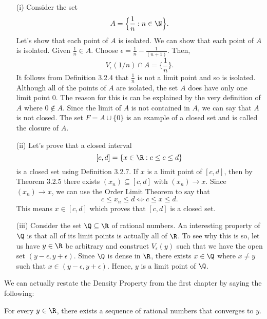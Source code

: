 \begin{ex}
\begin{enumerate}
    \item[(i)] Consider the set 
        \[ A = \Big\{ \frac{ 1 }{ n }  : n \in \N \Big\}.   \]
        Let's show that each point of \( A  \) is isolated. We can show that each point of \( A  \) is isolated. Given \( \frac{ 1 }{ n }  \in A \). Choose \( \epsilon = \frac{ 1 }{ n }  - \frac{ 1 }{ (n+1) }. \) Then, 
        \[ V_{\epsilon } (1/n) \cap A = \Big\{ \frac{ 1 }{ n } \Big\}. \]
        It follows from Definition 3.2.4 that \( \frac{ 1 }{ n }  \) is not a limit point and so is isolated. Although all of the points of \( A  \) are isolated, the set \( A  \) does have only one limit point 0. The reason for this is can be explained by the very definition of \( A  \) where \( 0 \notin A  \). Since the limit of \( A \) is not contained in \( A \), we can say that \( A  \) is not closed. The set \( F = A \cup \{ 0 \}  \) is an example of a closed set and is called the closure of \( A \).   
    \item[(ii)] Let's prove that a closed interval 
        \[ [c,d] = \{ x \in \R : c \leq c \leq d \}  \]
        is a closed set using Definition 3.2.7. If \( x \) is a limit point of \( [c,d] \), then by Theorem 3.2.5 there exists \( (x_n) \subseteq [c,d] \) with \( (x_n) \to x  \). Since \( (x_n) \to x  \), we can use the Order Limit Theorem to say that 
        \[ c \leq x_n \leq d \iff c \leq x \leq d. \]
        This means \( x \in [c,d] \) which proves that \( [c,d] \) is a closed set. 
    \item[(iii)] Consider the set \( \Q \subseteq \R  \) of rational numbers. An interesting property of \( \Q \) is that all of its limit points is actually all of \( \R  \). To see why this is so, let us have \( y \in \R  \) be arbitrary and construct \( V_{\epsilon }(y) \) such that we have the open set \( (y- \epsilon , y + \epsilon ) \). Since \( \Q  \) is dense in \( \R \), there exists \( x \in \Q \) where \( x \neq y \) such that \(x \in (y-\epsilon , y+\epsilon ) \). Hence, \( y  \) is a limit point of \( \Q \).  
\end{enumerate}
\end{ex}

We can actually restate the Density Property from the first chapter by saying the following:

\begin{tcolorbox}
\begin{thm}
For every \( y \in \R  \), there exists a sequence of rational numbers that converges to \( y \). 
\end{thm}
\end{tcolorbox}

